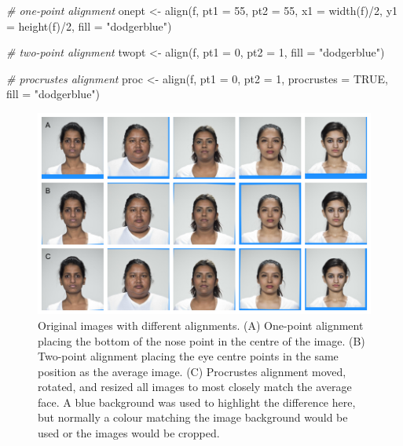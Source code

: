 \documentclass[
  man,floatsintext]{apa6}
\newenvironment{Shaded}{\begin{snugshade}}{\end{snugshade}}
\newcommand{\AttributeTok}[1]{\textcolor[rgb]{0.77,0.63,0.00}{#1}}
\newcommand{\CommentTok}[1]{\textcolor[rgb]{0.56,0.35,0.01}{\textit{#1}}}
\newcommand{\ConstantTok}[1]{\textcolor[rgb]{0.00,0.00,0.00}{#1}}
\newcommand{\DecValTok}[1]{\textcolor[rgb]{0.00,0.00,0.81}{#1}}
\newcommand{\FunctionTok}[1]{\textcolor[rgb]{0.00,0.00,0.00}{#1}}
\newcommand{\NormalTok}[1]{#1}
\newcommand{\OtherTok}[1]{\textcolor[rgb]{0.56,0.35,0.01}{#1}}
\newcommand{\SpecialCharTok}[1]{\textcolor[rgb]{0.00,0.00,0.00}{#1}}
\newcommand{\StringTok}[1]{\textcolor[rgb]{0.31,0.60,0.02}{#1}}
\begin{document}
\begin{Shaded}
\begin{Highlighting}[]
\CommentTok{\# one{-}point alignment}
\NormalTok{onept }\OtherTok{\textless{}{-}} \FunctionTok{align}\NormalTok{(f, }\AttributeTok{pt1 =} \DecValTok{55}\NormalTok{, }\AttributeTok{pt2 =} \DecValTok{55}\NormalTok{,}
               \AttributeTok{x1 =} \FunctionTok{width}\NormalTok{(f)}\SpecialCharTok{/}\DecValTok{2}\NormalTok{, }\AttributeTok{y1 =} \FunctionTok{height}\NormalTok{(f)}\SpecialCharTok{/}\DecValTok{2}\NormalTok{,}
               \AttributeTok{fill =} \StringTok{"dodgerblue"}\NormalTok{)}

\CommentTok{\# two{-}point alignment}
\NormalTok{twopt }\OtherTok{\textless{}{-}} \FunctionTok{align}\NormalTok{(f, }\AttributeTok{pt1 =} \DecValTok{0}\NormalTok{, }\AttributeTok{pt2 =} \DecValTok{1}\NormalTok{, }\AttributeTok{fill =} \StringTok{"dodgerblue"}\NormalTok{)}

\CommentTok{\# procrustes alignment}
\NormalTok{proc }\OtherTok{\textless{}{-}} \FunctionTok{align}\NormalTok{(f, }\AttributeTok{pt1 =} \DecValTok{0}\NormalTok{, }\AttributeTok{pt2 =} \DecValTok{1}\NormalTok{, }\AttributeTok{procrustes =} \ConstantTok{TRUE}\NormalTok{, }\AttributeTok{fill =} \StringTok{"dodgerblue"}\NormalTok{)}
\end{Highlighting}
\end{Shaded}

\begin{figure}
\includegraphics[width=1\linewidth]{index_files/figure-latex/norm-comp-1} \caption{Original images with different alignments. (A) One-point alignment placing the bottom of the nose point in the centre of the image. (B) Two-point alignment placing the eye centre points in the same position as the average image. (C) Procrustes alignment moved, rotated, and resized all images to most closely match the average face. A blue background was used to highlight the difference here, but normally a colour matching the image background would be used or the images would be cropped.}\label{fig:norm-comp}
\end{figure}
\end{document}
